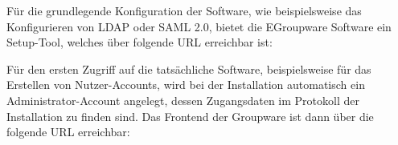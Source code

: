 Für die grundlegende Konfiguration der Software, wie beispielsweise das Konfigurieren von LDAP oder SAML 2.0, bietet die EGroupware Software ein Setup-Tool, welches über folgende URL erreichbar ist:


Für den ersten Zugriff auf die tatsächliche Software, beispielsweise für das Erstellen von Nutzer-Accounts, wird bei der Installation automatisch ein Administrator-Account angelegt, dessen Zugangsdaten im Protokoll der Installation zu finden sind.
Das Frontend der Groupware ist dann über die folgende URL erreichbar:

